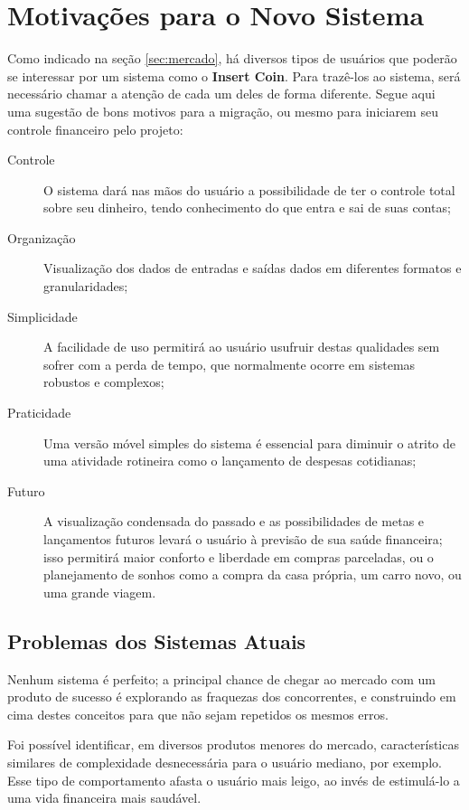 \documentclass[a4paper]{abnt}
\begin{document}
\section{Motivações para o Novo Sistema}
Como indicado na seç\~ao \ref{sec:mercado}, há diversos tipos de usuários que poder\~ao se interessar por um sistema como o \textbf{Insert Coin}. Para trazê-los ao sistema, será necessário chamar a atenç\~ao de cada um deles de forma diferente. Segue aqui uma sugest\~ao de bons motivos para a migraç\~ao, ou mesmo para iniciarem seu controle financeiro pelo projeto:

\begin{description}
	\item[Controle] O sistema dará nas m\~aos do usuário a possibilidade de ter o controle total sobre seu dinheiro, tendo conhecimento do que entra e sai de suas contas;
	\item[Organizaç\~ao] Visualizaç\~ao dos dados de entradas e saídas dados em diferentes formatos e granularidades;
	\item[Simplicidade] A facilidade de uso permitirá ao usuário usufruir destas qualidades sem sofrer com a perda de tempo, que normalmente ocorre em sistemas robustos e complexos;
	\item[Praticidade] Uma vers\~ao móvel simples do sistema é essencial para diminuir o atrito de uma atividade rotineira como o lançamento de despesas cotidianas;
	\item[Futuro] A visualizaç\~ao condensada do passado e as possibilidades de metas e lançamentos futuros levará o usuário à previs\~ao de sua saúde financeira; isso permitirá maior conforto e liberdade em compras parceladas, ou o planejamento de sonhos como a compra da casa própria, um carro novo, ou uma grande viagem.
\end{description}

\subsection{Problemas dos Sistemas Atuais}
Nenhum sistema é perfeito; a principal chance de chegar ao mercado com um produto de sucesso é explorando as fraquezas dos concorrentes, e construindo em cima destes conceitos para que n\~ao sejam repetidos os mesmos erros.

Foi possível identificar, em diversos produtos menores do mercado, características similares de complexidade desnecessária para o usuário mediano, por exemplo. Esse tipo de comportamento afasta o usuário mais leigo, ao invés de estimulá-lo a uma vida financeira mais saudável.
\end{document}
